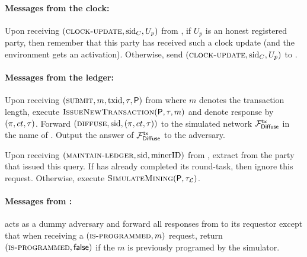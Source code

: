 \begin{simulatorbox}
    \paragraph{Messages from the clock:}
    Upon receiving $(\textsc{clock-update}, \mathrm{sid}_C , U_p)$ from \funcClock, if $U_p$ is an honest registered party, then remember that this party has received such a clock update (and the environment gets an activation).
    Otherwise, send $(\textsc{clock-update}, \mathrm{sid}_C , U_p)$ to \adv.

    \paragraph{Messages from the ledger:}
    \begin{cccItemize}[nosep]
        \item Upon receiving $(\textsc{submit}, m, \mathrm{txid}, \tau, \mathsf{P})$ from \funcFairLedger where $m$ denotes the transaction length, execute $\textsc{IssueNewTransaction}(\mathsf{P}, \tau, m)$ and denote response by $(\pi, ct, \mathsf{\tau})$.
        Forward $(\textsc{diffuse}, \mathrm{sid},\allowbreak (\pi, ct, \mathsf{\tau}))$ to the simulated network $\mathcal{F}_{\mathsf{Diffuse}}^{\mathsf{tx}}$ in the name of \party.
        Output the answer of $\mathcal{F}_{\mathsf{Diffuse}}^{\mathsf{tx}}$ to the adversary.

        \item Upon receiving $(\textsc{maintain-ledger}, \mathrm{sid}, \mathrm{minerID})$ from \funcFairLedger, extract from \honestInputSeq the party \party that issued this query.
        If \party has already completed its round-task, then ignore this request.
        Otherwise, execute $\textsc{SimulateMining}(\mathsf{P}, \tau_\mathcal{L})$.
    \end{cccItemize}

    \paragraph{Messages from \funcGrpoRO:}
    \simulator acts as a dummy adversary and forward all responses from \funcGrpoRO to its requestor except that when receiving a $(\textsc{is-programmed}, m)$ request, return $(\textsc{is-programmed}, \mathsf{false})$ if the $m$ is previously programed by the simulator.
\end{simulatorbox}